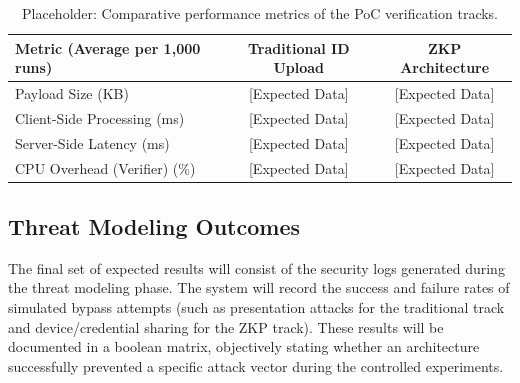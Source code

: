 \documentclass [english]{hogent-article}
\begin{document}
    \begin{table}[t]
        
        \centering
        
        \begin{tabular}{|l|c|c|}
            
            \hline
            
            \textbf{Metric (Average per 1,000 runs)} & \textbf{Traditional ID Upload} & \textbf{ZKP Architecture} \\ \hline
            
            Payload Size (KB) & [Expected Data] & [Expected Data] \\ \hline
            
            Client-Side Processing (ms) & [Expected Data] & [Expected Data] \\ \hline
            
            Server-Side Latency (ms) & [Expected Data] & [Expected Data] \\ \hline
            
            CPU Overhead (Verifier) (\%) & [Expected Data] & [Expected Data] \\ \hline
            
        \end{tabular}
        
        \caption{Placeholder: Comparative performance metrics of the PoC verification tracks.}
        
        \label{tab:expected_metrics}
        
    \end{table}
    
    
    
    \subsection{Threat Modeling Outcomes}
    
    The final set of expected results will consist of the security logs generated during the threat modeling phase. The system will record the success and failure rates of simulated bypass attempts (such as presentation attacks for the traditional track and device/credential sharing for the ZKP track). These results will be documented in a boolean matrix, objectively stating whether an architecture successfully prevented a specific attack vector during the controlled experiments.
    
    
    
\end{document}
